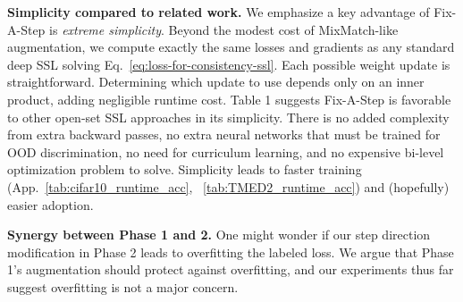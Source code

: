 


\textbf{Simplicity compared to related work.}
We emphasize a key advantage of Fix-A-Step is \emph{extreme simplicity}.
Beyond the modest cost of MixMatch-like augmentation, we compute exactly the same losses and gradients as any standard deep SSL solving Eq.~\eqref{eq:loss-for-consistency-ssl}.
Each possible weight update is straightforward.
Determining which update to use depends only on an inner product, adding negligible runtime cost.
Table 1 suggests Fix-A-Step is favorable to other open-set SSL approaches in its simplicity.
There is no added complexity from extra backward passes, no extra neural networks that must be trained for OOD discrimination, no need for curriculum learning, and no expensive bi-level optimization problem to solve.
Simplicity leads to faster training (App.~\ref{tab:cifar10_runtime_acc}, ~\ref{tab:TMED2_runtime_acc}) and (hopefully) easier adoption.

\textbf{Synergy between Phase 1 and 2.}
One might wonder if our step direction modification in Phase 2 leads to overfitting the labeled loss.
We argue that Phase 1's augmentation should protect against overfitting, and our experiments thus far suggest overfitting is not a major concern.



